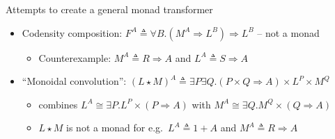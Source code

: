 \documentclass[english]{beamer}
\begin{document}
\begin{frame}{Attempts to create a general monad transformer}
\begin{itemize}
\begin{itemize}
\end{itemize}
\item Codensity composition: $F^{A}\triangleq\forall B.\left(M^{A}\Rightarrow L^{B}\right)\Rightarrow L^{B}$
-- not a monad
\begin{itemize}
\item Counterexample: $M^{A}\triangleq R\Rightarrow A$ and $L^{A}\triangleq S\Rightarrow A$
\end{itemize}
\item ``Monoidal convolution'': {\small{}$\left(L\star M\right)^{A}\triangleq\exists P\exists Q.\left(P\times Q\Rightarrow A\right)\times L^{P}\times M^{Q}$}{\small\par}
\begin{itemize}
\item combines $L^{A}\cong\exists P.L^{P}\times\left(P\Rightarrow A\right)$
with $M^{A}\cong\exists Q.M^{Q}\times\left(Q\Rightarrow A\right)$ 
\item $L\star M$ is not a monad for e.g.~$L^{A}\triangleq1+A$ and $M^{A}\triangleq R\Rightarrow A$
\end{itemize}
\end{itemize}
\end{frame}
\end{document}
